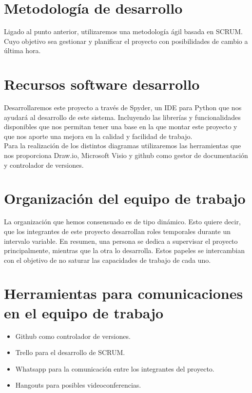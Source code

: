 \section{Metodología de desarrollo}

Ligado al punto anterior, utilizaremos una metodología ágil basada en SCRUM. Cuyo objetivo sea gestionar y planificar el proyecto con posibilidades de cambio a última hora. 

\section{Recursos software desarrollo}

Desarrollaremos este proyecto a través de Spyder, un IDE para Python que nos ayudará al desarrollo de este sistema. Incluyendo las librerías y funcionalidades disponibles que nos permitan tener una base en la que montar este proyecto y que nos aporte una mejora en la calidad y facilidad de trabajo. \\

Para la realización de los distintos diagramas utilizaremos las herramientas que nos proporciona Draw.io, Microsoft Visio y github como gestor de documentación y controlador de versiones.

\section{Organización del equipo de trabajo}

La organización que hemos consensuado es de tipo dinámico. Esto quiere decir, que los integrantes de este proyecto desarrollan roles temporales durante un intervalo variable. En resumen, una persona se dedica a supervisar el proyecto principalmente, mientras que la otra lo desarrolla. Estos papeles se intercambian con el objetivo de no saturar las capacidades de trabajo de cada uno.

\section{Herramientas para comunicaciones en el equipo de trabajo}

\begin{itemize}
	\item Github como controlador de versiones.
	\item Trello para el desarrollo de SCRUM.
	\item Whatsapp para la comunicación entre los integrantes del proyecto.
	\item Hangouts para posibles videoconferencias.
\end{itemize}

